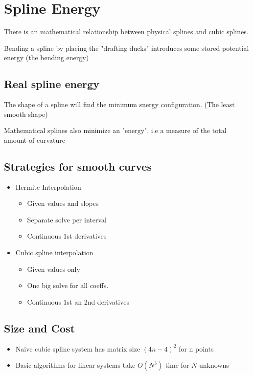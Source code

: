 \documentclass[twoside]{article}
\begin{document}
\section{Spline Energy}
There is an mathematical relationship between physical splines and cubic splines. 

Bending a spline by placing the "drafting ducks" introduces some stored potential energy (the bending energy) 

\subsection{Real spline energy }
The shape of a spline will find the minimum snergy configuration. (The least smooth shape)

Mathematical splines also minimize an "energy". i.e a measure of the total amount of curvature 

\subsection{Strategies for smooth curves}
\begin{itemize}
\item Hermite Interpolation
\begin{itemize}
\item Given values and slopes
\item Separate solve per interval
\item Continuous 1st derivatives
\end{itemize}
\item Cubic spline interpolation
\begin{itemize}
\item Given values only
\item One big solve for all coeffs.
\item Continuous 1st an 2nd derivatives
\end{itemize}
\end{itemize}

\subsection{Size and Cost}
\begin{itemize}
\item Naive cubic spline system has matrix size \((4n-4)^2\) for n points
\item Basic algorithms for linear systems take \(O(N^3)\) time for \(N\) unknowns 
\end{itemize}
\end{document}
